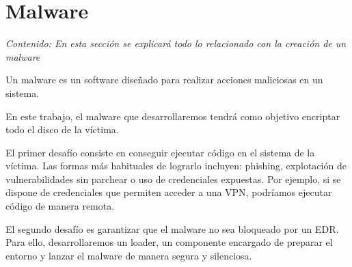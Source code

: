 \chapter{Malware}

\textit{Contenido: En esta sección se explicará todo lo relacionado con la 
creación de un malware}
\vspace{1em}

Un malware es un software diseñado para realizar acciones maliciosas en un 
sistema.

En este trabajo, el malware que desarrollaremos tendrá como objetivo encriptar 
todo el disco de la víctima.

El primer desafío consiste en conseguir ejecutar código en el sistema de la 
víctima. Las formas más habituales de lograrlo incluyen: phishing, explotación 
de vulnerabilidades sin parchear o uso de credenciales expuestas. Por ejemplo, 
si se dispone de credenciales que permiten acceder a una VPN, podríamos ejecutar 
código de manera remota.

El segundo desafío es garantizar que el malware no sea bloqueado por un EDR. 
Para ello, desarrollaremos un loader, un componente encargado de preparar el 
entorno y lanzar el malware de manera segura y silenciosa.




